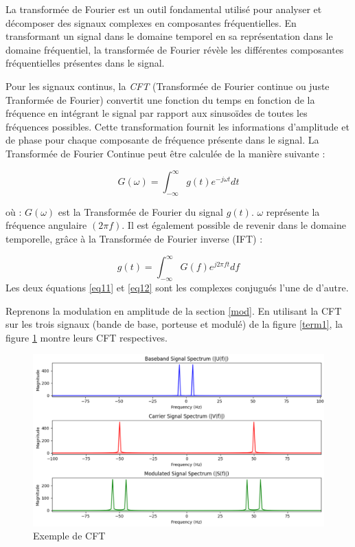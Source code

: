 \vspace{0.1cm}

La transformée de Fourier est un outil fondamental utilisé pour analyser et décomposer des signaux complexes en composantes fréquentielles. En transformant un signal dans le domaine temporel en sa représentation dans le domaine fréquentiel, la transformée de Fourier révèle les différentes composantes fréquentielles présentes dans le signal.

\vspace{0.1cm}

Pour les signaux continus, la \textit{CFT} (Transformée de Fourier continue ou juste Tranformée de Fourier) convertit une fonction du temps en fonction de la fréquence en intégrant le signal par rapport aux sinusoïdes de toutes les fréquences possibles. Cette transformation fournit les informations d'amplitude et de phase pour chaque composante de fréquence présente dans le signal. La Transformée de Fourier Continue peut être calculée de la manière suivante :  

\begin{equation}\label{eq11}
G(\omega) = \int_{-\infty}^{\infty} g(t)e^{-j\omega t} dt
\end{equation}

où : $G(\omega)$ est la Transformée de Fourier du signal $g(t)$. $\omega$ représente la fréquence angulaire $(2 \pi f)$.
Il est également possible de revenir dans le domaine temporelle, grâce à la Transformée de Fourier inverse (IFT) :

\begin{equation}\label{eq12}
g(t) = \int_{-\infty}^{\infty} G(f)e^{j2\pi ft} df
\end{equation}
Les deux équations \ref{eq11} et \ref{eq12} sont les complexes conjugués l'une de d'autre.

\vspace{0.1cm}

Reprenons la modulation en amplitude de la section \ref{mod}. En utilisant la CFT sur les trois signaux (bande de base, porteuse et modulé) de la figure \ref{term1}, la figure \ref{term8} montre leurs CFT respectives.

\begin{figure}[h]
\centering

\includegraphics[scale=0.5]{images/CFT.PNG}
\caption{Exemple de CFT}\label{term8}
\end{figure}


